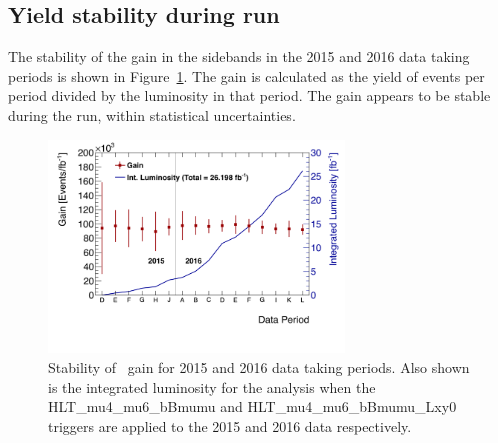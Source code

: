\subsection{Yield stability during run}
\label{sec:stability}
The stability of the gain in the \Bs sidebands in the 2015 and 2016 data taking periods is shown in Figure~\ref{fig:gainstability}. The gain is calculated as the yield of events per period divided by the luminosity in that period. The gain appears to be stable during the run, within statistical uncertainties.
\begin{figure}[!htb]
\begin{center}
\includegraphics[width=0.7\textwidth]{figures/InternalNote_DataMCComparison/comp/GainPlot.png}
\caption{Stability of \Bs\ gain for 2015 and 2016 data taking periods. Also shown is the integrated luminosity for the analysis when the HLT\_mu4\_mu6\_bBmumu and HLT\_mu4\_mu6\_bBmumu\_Lxy0 triggers are applied to the 2015 and 2016 data respectively.}
\label{fig:gainstability}
\end{center}
\end{figure}


\clearpage
